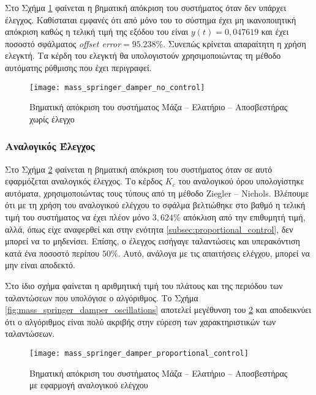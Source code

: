 Στο Σχήμα \ref{fig:mass_springer_damper_no_control} φαίνεται η βηματική απόκριση του συστήματος όταν δεν υπάρχει έλεγχος. Καθίσταται εμφανές ότι από μόνο του το σύστημα έχει μη ικανοποιητική απόκριση καθώς η τελική τιμή της εξόδου του είναι $y(t) = 0,047619$ και έχει ποσοστό σφάλματος \textit{offset error}$= 95.238 \%$. Συνεπώς κρίνεται απαραίτητη η χρήση ελεγκτή. Τα κέρδη του ελεγκτή θα υπολογιστούν χρησιμοποιώντας τη μέθοδο αυτόματης ρύθμισης που έχει περιγραφεί.

\begin{figure}[h]
  \centering
  \texttt{[image: mass\_springer\_damper\_no\_control]}
  \caption{Βηματική απόκριση του συστήματος Μάζα -- Ελατήριο -- Αποσβεστήρας χωρίς έλεγχο}
  \label{fig:mass_springer_damper_no_control}
\end{figure}

\subsubsection{Αναλογικός Έλεγχος}

Στο Σχήμα \ref{fig:mass_springer_damper_proportional_control} φαίνεται η βηματική απόκριση του συστήματος όταν σε αυτό εφαρμόζεται αναλογικός έλεγχος. Το κέρδος $K_c$ του αναλογικού όρου υπολογίστηκε αυτόματα, χρησιμοποιώντας τους τύπους από τη μέθοδο Ziegler -- Nichols. Βλέπουμε ότι με τη χρήση του αναλογικού ελέγχου το σφάλμα βελτιώθηκε στο βαθμό η τελική τιμή του συστήματος να έχει πλέον μόνο $3,624\%$ απόκλιση από την επιθυμητή τιμή, αλλά, όπως είχε αναφερθεί και στην ενότητα \ref{subsec:proportional_control}, δεν μπορεί να το μηδενίσει. Επίσης, ο έλεγχος εισήγαγε ταλαντώσεις και υπερακόντιση κατά ένα ποσοστό περίπου $50\%$. Αυτό, ανάλογα με τις απαιτήσεις ελέγχου, μπορεί να μην είναι αποδεκτό.

Στο ίδιο σχήμα φαίνεται η αριθμητική τιμή του πλάτους και της περιόδου των ταλαντώσεων που υπολόγισε ο αλγόριθμος. Το Σχήμα \ref{fig:mass_springer_damper_oscillations} αποτελεί μεγέθυνση του \ref{fig:mass_springer_damper_proportional_control} και αποδεικνύει ότι ο αλγόριθμος είναι πολύ ακριβής στην εύρεση των χαρακτηριστικών των ταλαντώσεων. 

\begin{figure}[h]
  \centering
  \texttt{[image: mass\_springer\_damper\_proportional\_control]}
  \caption{Βηματική απόκριση του συστήματος Μάζα -- Ελατήριο -- Αποσβεστήρας με εφαρμογή αναλογικού ελέγχου}
  \label{fig:mass_springer_damper_proportional_control}
\end{figure}


